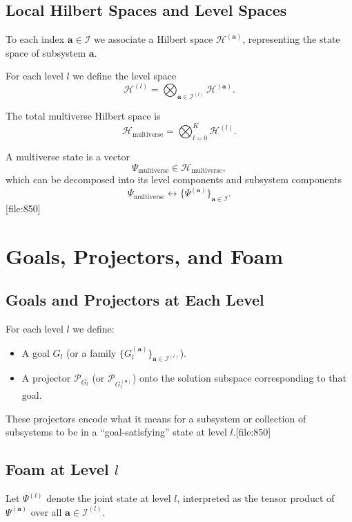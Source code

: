 \documentclass[12pt]{article}
\begin{document}
\subsection{Local Hilbert Spaces and Level Spaces}

To each index $\bm{a} \in \mathcal{I}$ we associate a Hilbert space
$\mathcal{H}^{(\bm{a})}$, representing the state space of subsystem $\bm{a}$.

For each level $l$ we define the level space
\[
\mathcal{H}^{(l)} =
\bigotimes_{\bm{a} \in \mathcal{I}^{(l)}} \mathcal{H}^{(\bm{a})}.
\]

The total multiverse Hilbert space is
\[
\mathcal{H}_{\text{multiverse}} =
\bigotimes_{l=0}^K \mathcal{H}^{(l)}.
\]

A multiverse state is a vector
\[
\Psi_{\text{multiverse}} \in \mathcal{H}_{\text{multiverse}},
\]
which can be decomposed into its level components and subsystem components
\[
\Psi_{\text{multiverse}}
\longleftrightarrow
\{ \Psi^{(\bm{a})} \}_{\bm{a} \in \mathcal{I}}.
\][file:850]

\section{Goals, Projectors, and Foam}

\subsection{Goals and Projectors at Each Level}

For each level $l$ we define:
\begin{itemize}
  \item A goal $G_l$ (or a family $\{G_l^{(\bm{a})}\}_{\bm{a} \in \mathcal{I}^{(l)}}$).
  \item A projector $\mathcal{P}_{G_l}$ (or $\mathcal{P}_{G_l^{(\bm{a})}}$) onto the
        solution subspace corresponding to that goal.
\end{itemize}

These projectors encode what it means for a subsystem or collection of subsystems
to be in a ``goal-satisfying'' state at level $l$.[file:850]

\subsection{Foam at Level \texorpdfstring{$l$}{l}}

Let $\Psi^{(l)}$ denote the joint state at level $l$, interpreted as the tensor
product of $\Psi^{(\bm{a})}$ over all $\bm{a} \in \mathcal{I}^{(l)}$.
\end{document}
